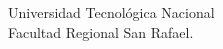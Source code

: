 \makeatletter
\begin{titlepage}
\centering
 \\
\vspace{1cm}
\begin{Huge}
\@title \\ 
\end{Huge}
\vspace{1cm}
\begin{large}
Universidad Tecnológica Nacional \\ 
  Facultad Regional San Rafael. \\
\end{large}
\vspace{5cm}
\@author \\
\@date \\
\end{titlepage}
\newpage
